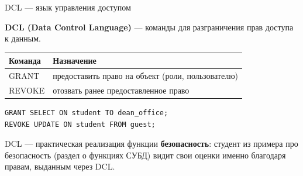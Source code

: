 \documentclass[aspectratio=169]{beamer}
\begin{document}
\begin{frame}[fragile]{DCL — язык управления доступом}

\textbf{DCL (Data Control Language)} — команды для
разграничения прав доступа к данным.

\vspace{0.3cm}

\small
\begin{table}
\centering
\begin{tabular}{>{\ttfamily}p{}|p{}}
\toprule
\textnormal{Команда} & \textnormal{Назначение}\\
\midrule
GRANT & предоставить право на объект (роли, пользователю)\\
REVOKE & отозвать ранее предоставленное право\\
\bottomrule
\end{tabular}
\end{table}

\vspace{0.3cm}

\begin{verbatim}
GRANT SELECT ON student TO dean_office;
REVOKE UPDATE ON student FROM guest;
\end{verbatim}
\normalsize

\vspace{0.1cm}
\footnotesize
DCL — практическая реализация функции \textbf{безопасность}:
студент из примера про безопасность (раздел о функциях СУБД)
видит свои оценки именно благодаря правам, выданным через DCL.

\end{frame}
\end{document}

